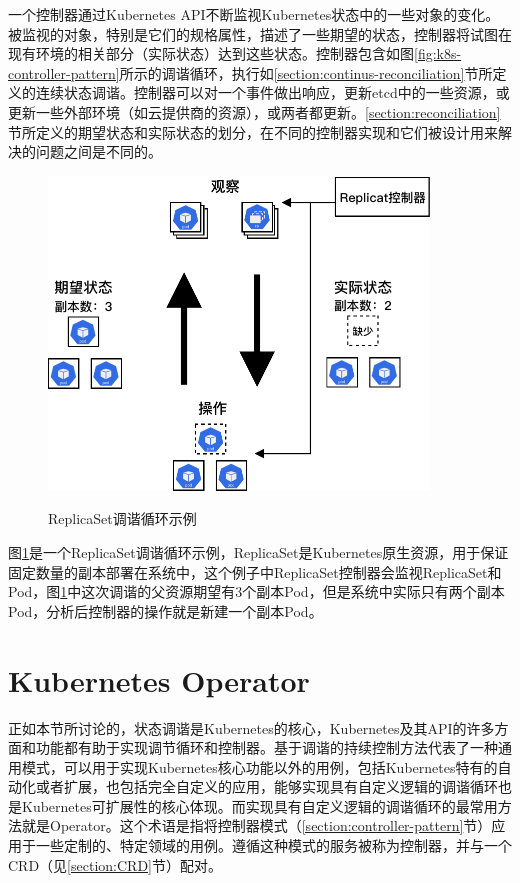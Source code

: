 \documentclass[macfonts,master]{njuthesis}
\begin{document}
一个控制器通过Kubernetes API不断监视Kubernetes状态中的一些对象的变化。被监视的对象，特别是它们的规格属性，描述了一些期望的状态，控制器将试图在现有环境的相关部分（实际状态）达到这些状态。控制器包含如图\ref{fig:k8s-controller-pattern}所示的调谐循环，执行如\ref{section:continus-reconciliation}节所定义的连续状态调谐。控制器可以对一个事件做出响应，更新etcd中的一些资源，或更新一些外部环境（如云提供商的资源），或两者都更新。\ref{section:reconciliation}节所定义的期望状态和实际状态的划分，在不同的控制器实现和它们被设计用来解决的问题之间是不同的。

\begin{figure}[htbp]
  \centering
  \includegraphics[width=0.9\textwidth]{pics/rs-control-loop.pdf}\\
  \caption{ReplicaSet调谐循环示例}\label{fig:rs-control-loop}
\end{figure}

图\ref{fig:rs-control-loop}是一个ReplicaSet调谐循环示例，ReplicaSet是Kubernetes原生资源，用于保证固定数量的副本部署在系统中，这个例子中ReplicaSet控制器会监视ReplicaSet和Pod，图\ref{fig:rs-control-loop}中这次调谐的父资源期望有3个副本Pod，但是系统中实际只有两个副本Pod，分析后控制器的操作就是新建一个副本Pod。


\section{Kubernetes Operator}

正如本节所讨论的，状态调谐是Kubernetes的核心，Kubernetes及其API的许多方面和功能都有助于实现调节循环和控制器。基于调谐的持续控制方法代表了一种通用模式，可以用于实现Kubernetes核心功能以外的用例，包括Kubernetes特有的自动化或者扩展，也包括完全自定义的应用，能够实现具有自定义逻辑的调谐循环也是Kubernetes可扩展性的核心体现。而实现具有自定义逻辑的调谐循环的最常用方法就是Operator。这个术语是指将控制器模式（\ref{section:controller-pattern}节）应用于一些定制的、特定领域的用例。遵循这种模式的服务被称为控制器，并与一个CRD（见\ref{section:CRD}节）配对。
\end{document}
